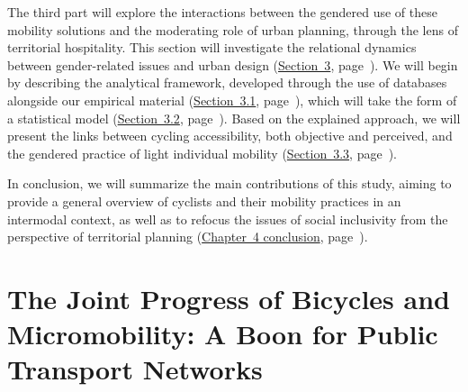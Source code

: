 \begin{refsegment}
The third part will explore the interactions between the gendered use of these mobility solutions and the moderating role of urban planning, through the lens of territorial hospitality. This section will investigate the relational dynamics between gender-related issues and urban design (\hyperref[section-chap4:cyclabilite-genre]{Section~3}, page~\pageref{section-chap4:cyclabilite-genre}). We will begin by describing the analytical framework, developed through the use of databases alongside our empirical material (\hyperref[chap4:materiau-empirique-genre]{Section~3.1}, page~\pageref{chap4:materiau-empirique-genre}), which will take the form of a statistical model (\hyperref[chap4:methodologie-modele-ols]{Section~3.2}, page~\pageref{chap4:methodologie-modele-ols}). Based on the explained approach, we will present the links between cycling accessibility, both objective and perceived, and the gendered practice of light individual mobility (\hyperref[section-chap4:cyclabilite-territoires-genre]{Section~3.3}, page~\pageref{section-chap4:cyclabilite-territoires-genre}).

In conclusion, we will summarize the main contributions of this study, aiming to provide a general overview of cyclists and their mobility practices in an intermodal context, as well as to refocus the issues of social inclusivity from the perspective of territorial planning (\hyperref[chap4:conclusion]{Chapter~4 conclusion}, page~\pageref{chap4:conclusion}).

\newpage
{} %
\section{The Joint Progress of Bicycles and Micromobility: A Boon for Public Transport Networks
    \label{section-chap4:progression-velo-micromobilite-aubaine}
    }


\end{refsegment}
